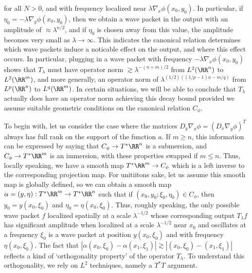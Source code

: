 for all $N > 0$, and with frequency localized near $\lambda \nabla_x \phi(x_0,y_0)$. In particular, if $\eta_0 = - \lambda \nabla_y \phi(x_0,y_0)$, then we obtain a wave packet in the output with an amplitude of $\approx \lambda^{n/2}$, and if $\eta_0$ is chosen away from this value, the amplitude becomes very small as $\lambda \to \infty$. This indicates the canonical relation determines which wave packets induce a noticable effect on the output, and where this effect occurs. In particular, plugging in a wave packet with frequency $- \lambda \nabla_x \phi(x_0,y_0)$ shows that $T_\lambda$ must have operator norm $\gtrsim \lambda^{-(n + m)/2}$ from $L^2(\RR^n)$ to $L^2(\RR^m)$, and more generally, an operator norm of $\lambda^{(1/2) ((1/p - 1) n - m / q)}$ from $L^p(\RR^n)$ to $L^q(\RR^m)$. In certain situations, we will be able to conclude that $T_\lambda$ actually does have an operator norm achieving this decay bound provided we assume suitable geometric conditions on the canonical relation $C_\phi$.

To begin with, let us consider the case where the matrices $D_y \nabla_x \phi = (D_x \nabla_y \phi)^T$ always has full rank on the support of the function $a$. If $m \geq n$, this information can be expressed by saying that $C_\phi \to T^* \RR^n$ is a submersion, and $C_\phi \to T^* \RR^m$ is an immersion, with these properties swapped if $m \leq n$. Thus, locally speaking, we have a smooth map $T^* \RR^m \to C_\phi$ which is a left inverse to the corresponding projection map. For unitiitons sake, let us assume this smooth map is globally defined, so we can obtain a smooth map $\alpha = (y,\eta): T^* \RR^m \to T^* \RR^n$ such that if $(x_0,y_0;\xi_0,\eta_0) \in C_\phi$, then $y_0 = y(x_0,\xi_0)$ and $\eta_0 = \eta(x_0,\xi_0)$. Thus, roughly speaking, the only possible wave packet $f$ localized spatially at a scale $\lambda^{-1/2}$ whose corresponding output $T_\lambda f$ has significant amplitude when localized at a scale $\lambda^{-1/2}$ near $x_0$ and oscillates at a frequency $\xi_0$ is a wave packet at position $y(x_0,\xi_0)$ and with frequency $\eta(x_0,\xi_0)$. The fact that $|\alpha(x_0,\xi_0) - \alpha(x_1,\xi_1)| \gtrsim |(x_0,\xi_0) - (x_1,\xi_1)|$ reflects a kind of `orthogonality property' of the operator $T_\lambda$. To understand this orthogonality, we rely on $L^2$ techniques, namely a $T^*T$ argument.

